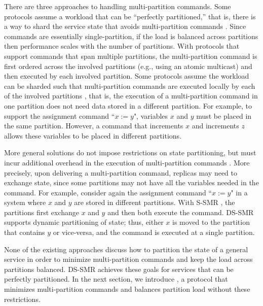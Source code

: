 There are three approaches to handling multi-partition commands.
Some protocols assume a workload that can be ``perfectly partitioned,'' that is, there is a way to shard the service state that avoids multi-partition commands \cite{hoang2016,Nogueira17}.
Since commands are essentially single-partition, if the load is balanced across partitions then performance scales with the number of partitions.
With protocols that support commands that span multiple partitions, the multi-partition command is first ordered across the involved partitions (e.g., using an atomic multicast) and then executed by each involved partition.
Some protocols assume the workload can be sharded such that multi-partition commands are executed locally by each of the involved partitions \cite{Mu2016}, that is, the execution of a multi-partition command in one partition does not need data stored in a different partition.
For example, to support the assignment command ``$x := y$", variables $x$ and $y$ must be placed in the same partition.
However, a command that increments $x$ and increments $z$ allows these variables to be placed in different partitions.

More general solutions do not impose restrictions on state partitioning, but must incur additional overhead in the execution of multi-partition commands \cite{bezerra2014ssmr, hoang2016}.
More precisely, upon delivering a multi-partition command, replicas may need to exchange state, since some partitions may not have all the variables needed in the command.
For example, consider again the assignment command ``$x := y$" in a system where $x$ and $y$ are stored in different partitions.
With S-SMR \cite{bezerra2014ssmr}, the partitions first exchange $x$ and $y$ and then both execute the command.
DS-SMR \cite{hoang2016} supports dynamic partitioning of state; thus, either $x$ is moved to the partition that contains $y$ or vice-versa, and the command is executed at a single partition.

None of the existing approaches discuss how to partition the state of a general service in order to minimize multi-partition commands and keep the load across partitions balanced.
DS-SMR \cite{hoang2016} achieves these goals for services that can be perfectly partitioned.
In the next section, we introduce \dynastar, a protocol that minimizes multi-partition commands and balances partition load without these restrictions. 


